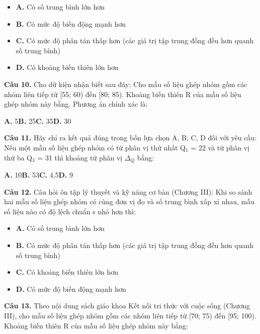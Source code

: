 \documentclass[11pt,a4paper]{article}
\begin{document}
\begin{itemize}\setlength{\itemsep}{1pt}\setlength{\parskip}{0pt}
  \item[] \textbf{A.} Có số trung bình lớn hơn
  \item[] \textbf{B.} Có mức độ biến động mạnh hơn
  \item[] \textbf{C.} Có mức độ phân tán thấp hơn (các giá trị tập trung đồng đều hơn quanh số trung bình)
  \item[] \textbf{D.} Có khoảng biến thiên lớn hơn
\end{itemize}\vspace{2pt}
\textbf{\color{primary} Câu 10.} Cho dữ kiện nhận biết sau đây: Cho mẫu số liệu ghép nhóm gồm các nhóm liên tiếp từ [55; 60) đến [80; 85). Khoảng biến thiên R của mẫu số liệu ghép nhóm này bằng. Phương án chính xác là:\par
\hspace*{1.5em}\textbf{A.} 5\quad\quad \textbf{B.} 25\quad\quad \textbf{C.} 35\quad\quad \textbf{D.} 30\par\vspace{2pt}
\textbf{\color{primary} Câu 11.} Hãy chỉ ra kết quả đúng trong bốn lựa chọn A, B, C, D đối với yêu cầu: Nếu một mẫu số liệu ghép nhóm có tứ phân vị thứ nhất Q$_1$ = 22 và tứ phân vị thứ ba Q$_3$ = 31 thì khoảng tứ phân vị $\Delta_Q$ bằng:\par
\hspace*{1.5em}\textbf{A.} 10\quad\quad \textbf{B.} 53\quad\quad \textbf{C.} 4,5\quad\quad \textbf{D.} 9\par\vspace{2pt}
\textbf{\color{primary} Câu 12.} Câu hỏi ôn tập lý thuyết và kỹ năng cơ bản (Chương III): Khi so sánh hai mẫu số liệu ghép nhóm có cùng đơn vị đo và số trung bình xấp xỉ nhau, mẫu số liệu nào có độ lệch chuẩn s nhỏ hơn thì:\par
\begin{itemize}\setlength{\itemsep}{1pt}\setlength{\parskip}{0pt}
  \item[] \textbf{A.} Có số trung bình lớn hơn
  \item[] \textbf{B.} Có mức độ phân tán thấp hơn (các giá trị tập trung đồng đều hơn quanh số trung bình)
  \item[] \textbf{C.} Có khoảng biến thiên lớn hơn
  \item[] \textbf{D.} Có mức độ biến động mạnh hơn
\end{itemize}\vspace{2pt}
\textbf{\color{primary} Câu 13.} Theo nội dung sách giáo khoa Kết nối tri thức với cuộc sống (Chương III), cho mẫu số liệu ghép nhóm gồm các nhóm liên tiếp từ [70; 75) đến [95; 100). Khoảng biến thiên R của mẫu số liệu ghép nhóm này bằng:\par
\end{document}
